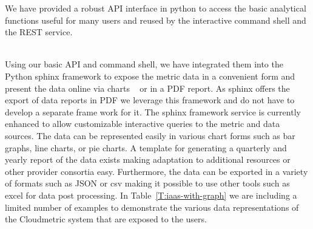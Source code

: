 \documentclass{tex/sig-alternate-2013}
\begin{document}
{\begin{description}[leftmargin=*,itemsep=0pt,topsep=0pt]
\item[Programming API.] We have provided a robust API interface in python to access the basic analytical functions useful for many users and reused by the interactive command shell and the REST service.

\item[Graphical Representation and Printable Reports.] ~\\ Using our basic API and command shell, we have integrated them into the Python sphinx framework \cite{brandl2009sphinx} to expose the metric data in a convenient form and present the data online via charts ~\cite{highsoft2012highcharts} or in a PDF report. As sphinx offers the export of data reports in PDF we leverage this framework and do not have to develop a separate frame work for it. The sphinx framework service is currently enhanced to allow customizable interactive queries to the metric and data sources. The data can be represented easily in various chart forms such as bar graphs, line charts, or pie charts. A template for generating a quarterly and yearly report of the data exists making adaptation to additional resources or other provider consortia easy. Furthermore, the data can be exported in a variety of formats such as JSON or csv making it possible to use other tools such as excel for data post processing.  In Table~\ref{T:iaas-with-graph} we are including a limited number of examples to demonstrate the various data representations of the Cloudmetric system that are exposed to the users.

\end{description}

}
\end{document}
